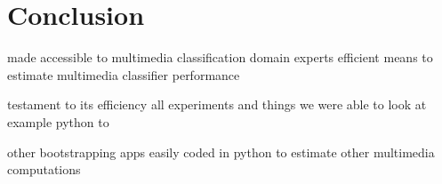 \section{Conclusion}

made accessible to multimedia classification domain experts 
efficient means to estimate multimedia classifier performance 

testament to its efficiency all experiments and things we were able to look at
example python to 

other bootstrapping apps easily coded in python
 to estimate  other multimedia computations

